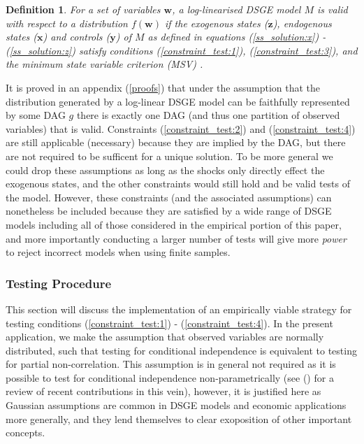 \documentclass{article}
\newtheorem{definition}{Definition}
\begin{document}
\begin{definition}
  For a set of variables $\mathbf{w}$, a log-linearised DSGE model $M$ is \textit{valid} with respect to a distribution $f(\mathbf{w})$ if the exogenous states ($\mathbf{z}$), endogenous states ($\mathbf{x}$) and controls ($\mathbf{y}$) of $M$ as defined in equations (\ref{ss_solution:x}) - (\ref{ss_solution:z}) satisfy conditions (\ref{constraint_test:1}), (\ref{constraint_test:3}), and the minimum state variable criterion (MSV) \parencite{mccallum1999role}.
  \label{validity}
\end{definition}

It is proved in an appendix (\ref{proofs}) that under the assumption that the distribution generated by a log-linear DSGE model can be faithfully represented by some DAG $g$ there is exactly one DAG (and thus one partition of observed variables) that is valid. Constraints (\ref{constraint_test:2}) and (\ref{constraint_test:4}) are still applicable (necessary) because they are implied by the DAG, but there are not required to be sufficent for a unique solution. To be more general we could drop these assumptions as long as the shocks only directly effect the exogenous states, and the other constraints would still hold and be valid tests of the model. However, these constraints (and the associated assumptions) can nonetheless be included because they are satisfied by a wide range of DSGE models including all of those considered in the empirical portion of this paper, and more importantly conducting a larger number of tests will give more \textit{power} to reject incorrect models when using finite samples.

\subsubsection{Testing Procedure} \label{testing}

This section will discuss the implementation of an empirically viable strategy for testing conditions (\ref{constraint_test:1}) - (\ref{constraint_test:4}). In the present application, we make the assumption that observed variables are normally distributed, such that testing for conditional independence is equivalent to testing for partial non-correlation. This assumption is in general not required as it is possible to test for conditional independence non-parametrically (see \citeauthor{strobl2019approximate} (\citeyear{strobl2019approximate}) for a review of recent contributions in this vein), however, it is justified here as Gaussian assumptions are common in DSGE models and economic applications more generally, and they lend themselves to clear exoposition of other important concepts. 
\end{document}
